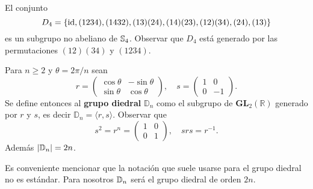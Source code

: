 
\begin{example}
El conjunto
\[
D_4=\{\operatorname{id},(1234),(1432),(13)(24),(14)(23),(12)(34),(24),(13)\}
\]
es un subgrupo no abeliano de $\mathbb{S}_4$.	Observar que $D_4$ está generado por las permutaciones 
$(12)(34)$ y $(1234)$. 	
\end{example}

\begin{example}
	Para $n\geq2$ y $\theta=2\pi/n$ sean  
	\[
		r=\left(\begin{array}{cc}
			\cos\theta & -\sin\theta\\
			\sin\theta & \cos\theta
		\end{array}\right),\quad s=\left(\begin{array}{cc}
			1 & 0\\
			0 & -1
		\end{array}\right).
	\]
	Se define entonces al \textbf{grupo diedral} $\mathbb{D}_{n}$ como el subgrupo
	de $\mathbf{GL}_2(\mathbb{R})$ generado por $r$ y $s$, es decir
	$\mathbb{D}_{n}=\langle r,s\rangle$. Observar que 
	\[
	s^2=r^n=\begin{pmatrix}
	1 & 0\\
	0 & 1	
	\end{pmatrix},\quad
	srs=r^{-1}.
	\]
	Además $|\mathbb{D}_n|=2n$. 
\end{example}

Es conveniente mencionar que la notación que suele usarse para el grupo diedral no es estándar. Para nosotros $\mathbb{D}_n$ será el grupo diedral de orden $2n$. 

